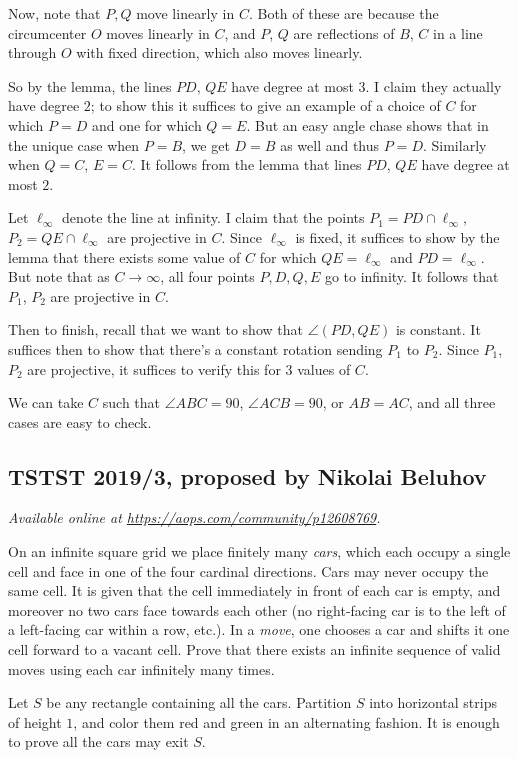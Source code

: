 \documentclass[11pt]{scrartcl}
\begin{document}
Now, note that $P,Q$ move linearly in $C$.
Both of these are because the circumcenter $O$ moves linearly in $C$,
and $P$, $Q$ are reflections of $B$, $C$ in a
line through $O$ with fixed direction, which also moves linearly.

So by the lemma, the lines $PD$, $QE$ have degree at most $3$.
I claim they actually have degree $2$;
to show this it suffices to give an example of a choice of $C$
for which $P=D$ and one for which $Q=E$.
But an easy angle chase shows that in the unique case when $P=B$,
we get $D=B$ as well and thus $P=D$. Similarly when $Q=C$, $E=C$.
It follows from the lemma that lines $PD$, $QE$ have degree at most $2$.

Let $\ell_\infty$ denote the line at infinity.
I claim that the points $P_1=PD \cap \ell_\infty$,
$P_2=QE \cap \ell_\infty$ are projective in $C$.
Since $\ell_\infty$ is fixed, it suffices to show by the lemma that there
exists some value of $C$ for which $QE=\ell_\infty$ and $PD = \ell_\infty$.
But note that as $C \to \infty$, all four points $P,D,Q,E$ go to infinity.
It follows that $P_1$, $P_2$ are projective in $C$.

Then to finish,
recall that we want to show that $\angle (PD, QE)$ is constant.
It suffices then to show that there's a constant rotation
sending $P_1$ to $P_2$. Since $P_1$, $P_2$ are projective,
it suffices to verify this for $3$ values of $C$.

We can take $C$ such that $\angle ABC=90$, $\angle ACB = 90$,
or $AB=AC$, and all three cases are easy to check.
\pagebreak

\subsection{TSTST 2019/3, proposed by Nikolai Beluhov}
\textsl{Available online at \url{https://aops.com/community/p12608769}.}
\begin{mdframed}[style=mdpurplebox,frametitle={Problem statement}]
On an infinite square grid we place finitely many \emph{cars},
which each occupy a single cell and face in one of the four cardinal directions.
Cars may never occupy the same cell.
It is given that the cell immediately in front of each car is empty,
and moreover no two cars face towards each other
(no right-facing car is to the left of a left-facing car within a row, etc.).
In a \emph{move}, one chooses a car and shifts it one cell forward to a vacant cell.
Prove that there exists an infinite sequence of valid moves
using each car infinitely many times.
\end{mdframed}
Let $S$ be any rectangle containing all the cars.
Partition $S$ into horizontal strips of height $1$,
and color them red and green in an alternating fashion.
It is enough to prove all the cars may exit $S$.
\end{document}
